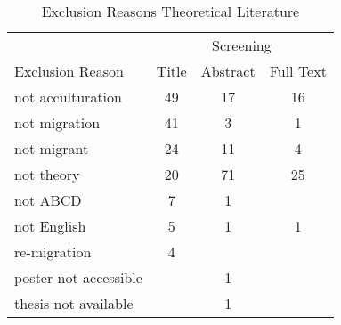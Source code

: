 \begin{table}
\begin{minipage}[t][\textheight][t]{\textwidth}

\caption{\label{tab:TheoryExclusion}Exclusion Reasons Theoretical Literature}
\begin{tabular}[t]{lccc}
\toprule
\multicolumn{1}{c}{ } & \multicolumn{3}{c}{Screening} \\
\cmidrule(l{3pt}r{3pt}){2-4}
Exclusion Reason & Title & Abstract & Full Text\\
\midrule
not acculturation & 49 & 17 & 16\\
not migration & 41 & 3 & 1\\
not migrant & 24 & 11 & 4\\
not theory & 20 & 71 & 25\\
not ABCD & 7 & 1 & \\
not English & 5 & 1 & 1\\
re-migration & 4 &  & \\
poster not accessible &  & 1 & \\
thesis not available &  & 1 & \\
\bottomrule
\end{tabular}
\end{minipage}
\end{table}
